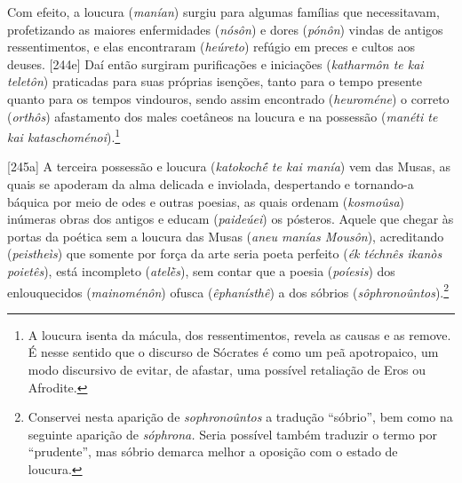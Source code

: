 Com efeito, a loucura (\emph{manían}) surgiu para algumas famílias que
necessitavam, profetizando as maiores enfermidades (\emph{nósôn}) e
dores (\emph{pónôn}) vindas de antigos ressentimentos, e elas
encontraram (\emph{heúreto}) refúgio em preces e cultos aos deuses.
{[}244e{]} Daí então surgiram purificações e iniciações (\emph{katharmôn
te kai teletôn}) praticadas para suas próprias isenções, tanto para o
tempo presente quanto para os tempos vindouros, sendo assim encontrado
(\emph{heuroméne}) o correto (\emph{orthôs}) afastamento dos males
coetâneos na loucura e na possessão (\emph{manéti te kai
kataschoménoi}).\footnote{A loucura isenta da mácula, dos
  ressentimentos, revela as causas e as remove. É nesse sentido que o
  discurso de Sócrates é como um peã apotropaico, um modo discursivo de
  evitar, de afastar, uma possível retaliação de Eros ou Afrodite.}

{[}245a{]} A terceira possessão e loucura (\emph{katokochḗ te kai
manía}) vem das Musas, as quais se apoderam da alma delicada e
inviolada, despertando e tornando-a báquica por meio de odes e outras
poesias, as quais ordenam (\emph{kosmoûsa}) inúmeras obras dos antigos e
educam (\emph{paideúei}) os pósteros. Aquele que chegar às portas da
poética sem a loucura das Musas (\emph{aneu manías Mousôn}), acreditando
(\emph{peistheìs}) que somente por força da arte seria poeta perfeito
(\emph{ék téchnês ikanòs poietês}), está incompleto (\emph{atelḕs}), sem
contar que a poesia (\emph{poíesis}) dos enlouquecidos
(\emph{mainoménôn}) ofusca (\emph{êphanísthê}) a dos sóbrios
(\emph{sôphronoûntos}).\footnote{Conservei nesta aparição de
  \emph{sophronoûntos} a tradução ``sóbrio'', bem como na seguinte
  aparição de \emph{sóphrona.} Seria possível também traduzir o termo
  por ``prudente'', mas sóbrio demarca melhor a oposição com o estado de
  loucura.}


